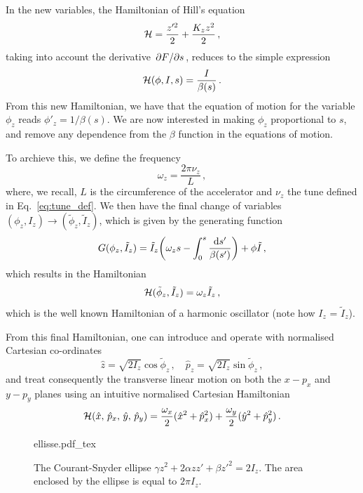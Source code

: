 In the new variables, the Hamiltonian of Hill's equation
\begin{equation} 
    \mathcal{H} = \frac{z'^2}{2} + \frac{K_z z^2}{2} \,,
\end{equation}
taking into account the derivative $\pdv*{F}{s}$, reduces to the simple expression
\begin{equation}
	\mathcal{H}(\phi,I,s) = \frac{I}{\beta(s)}\, .
\end{equation}
From this new Hamiltonian, we have that the equation of motion for the variable $\phi_z$ reads $\phi'_z = 1/\beta(s)$. We are now interested in making $\phi_z$ proportional to $s$, and remove any dependence from the $\beta$ function in the equations of motion.

To archieve this, we define the frequency
\begin{equation}
    \omega_z = \frac{2\pi\nu_z}{L} \,,
\end{equation}
where, we recall, $L$ is the circumference of the accelerator and $\nu_z$ the tune defined in Eq.~\eqref{eq:tune_def}. We then have the final change of variables $(\phi_z,I_z)\to(\tilde\phi_z, \tilde I_z)$, which is given by the generating function
%
\begin{equation}
	G(\phi_z,\tilde I_z) = \tilde I_z\qty(\omega_z s - \int_0^s\frac{\dd s'}{\beta(s')})+\phi\tilde I\, ,
\end{equation}
%
which results in the Hamiltonian
%
\begin{equation}
	\mathcal{H}(\tilde \phi_z,\tilde I_z) = \omega_z \tilde I_z\,,
	\label{eq:harm_ham}
 \end{equation}
%
which is the well known Hamiltonian of a harmonic oscillator (note how $I_z$ = $\tilde{I}_z$).

From this final Hamiltonian, one can introduce and operate with normalised Cartesian co-ordinates 
\begin{equation}
    \hat z=\sqrt{2I_z}\cos\tilde{\phi}_z\,,\quad \hat p_z=\sqrt{2I_z}\sin\tilde{\phi}_z \,,
    \label{eq:2:cart_eq}
\end{equation}
and treat consequently the transverse linear motion on both the $x-p_x$ and $y-p_y$ planes using an intuitive normalised Cartesian Hamiltonian
%
\begin{equation}
	\mathcal{H}(\hat x,\, \hat p_x,\, \hat y,\, \hat p_y) = \frac{\omega_x}{2}(\hat x^2 +\hat p_x^2) + \frac{\omega_y}{2}(\hat y^2+\hat p_y^2)\, .
	\label{eq:linham}
\end{equation}
%

\begin{figure}
    \centering
    \def\svgwidth{0.75\columnwidth}
    {ellisse.pdf_tex}
    \caption{The Courant-Snyder ellipse $\gamma z^2 + 2\alpha zz' + \beta z'^2=2I_z$. The area enclosed by the ellipse is equal to $2\pi I_z$. }
    \label{fig:coursnyd}
\end{figure}


